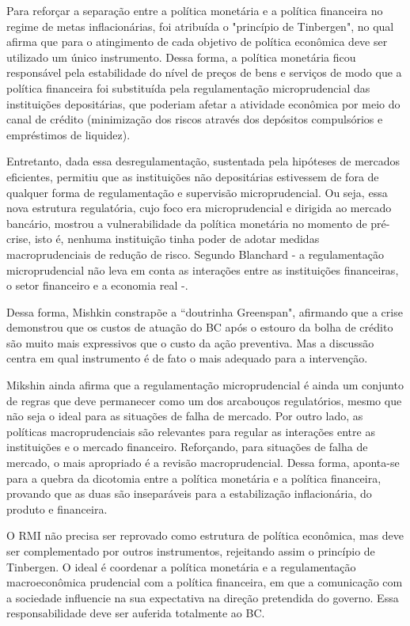 \documentclass[report]{uftex}
\begin{document}
Para reforçar a separação entre a política monetária e a política financeira no regime de metas inflacionárias, foi atribuída o "princípio de Tinbergen", no qual afirma que para o atingimento de cada objetivo de política econômica deve ser utilizado um único instrumento. Dessa forma, a política monetária ficou responsável pela estabilidade do nível de preços de bens e serviços de modo que a política financeira foi substituída pela regulamentação microprudencial das instituições depositárias, que poderiam afetar a atividade econômica por meio do canal de crédito (minimização dos riscos através dos depósitos compulsórios e empréstimos de liquidez). 

Entretanto, dada essa desregulamentação, sustentada pela hipóteses de mercados eficientes, permitiu que as instituições não depositárias estivessem de fora de qualquer forma de regulamentação e supervisão microprudencial. Ou seja, essa nova estrutura regulatória, cujo foco era microprudencial e dirigida ao mercado bancário, mostrou a vulnerabilidade da política monetária no momento de pré-crise, isto é, nenhuma instituição tinha poder de adotar medidas macroprudenciais de redução de risco. Segundo Blanchard - a regulamentação microprudencial não leva em conta as interações entre as instituições financeiras, o setor financeiro e a economia real -.

Dessa forma, Mishkin constrapõe a ``doutrinha Greenspan", afirmando que a crise demonstrou que os custos de atuação do BC após o estouro da bolha de crédito são muito mais expressivos que o custo da ação preventiva. Mas a discussão centra em qual instrumento é de fato o mais adequado para a intervenção. 

Mikshin ainda afirma que a regulamentação microprudencial é ainda um conjunto de regras que deve permanecer como um dos arcabouços regulatórios, mesmo que não seja o ideal para as situações de falha de mercado. Por outro lado, as políticas macroprudenciais são relevantes para regular as interações entre as instituições e o mercado financeiro. Reforçando, para situações de falha de mercado, o mais apropriado é a revisão macroprudencial. Dessa forma, aponta-se para a quebra da dicotomia entre a política monetária e a política financeira, provando que as duas são inseparáveis para a estabilização inflacionária, do produto e financeira. 

O RMI não precisa ser reprovado como estrutura de política econômica, mas deve ser complementado por outros instrumentos, rejeitando assim o princípio de Tinbergen. O ideal é coordenar a política monetária e a regulamentação macroeconômica prudencial com a política financeira, em que a comunicação com a sociedade influencie na sua expectativa na direção pretendida do governo. Essa responsabilidade deve ser auferida totalmente ao BC.  
\end{document}

